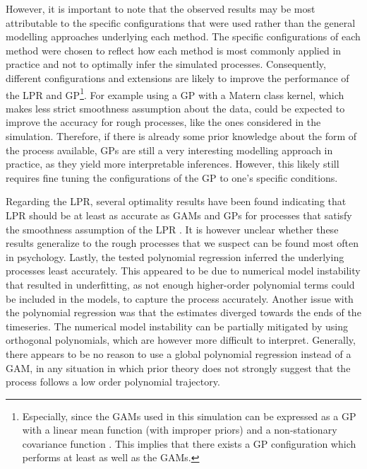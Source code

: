 \documentclass[man, floatsintext]{apa7}
\begin{document}
However, it is important to note that the observed results may be most
attributable to the specific configurations that were used rather than the
general modelling approaches underlying each method. The specific
configurations of each method were chosen to reflect how each method is most
commonly applied in practice and not to optimally infer the simulated
processes. Consequently, different configurations and extensions are likely to
improve the performance of the LPR and GP\footnote{Especially, since the GAMs
  used in this simulation can be expressed as a GP with a linear mean function
  (with improper priors) and a non-stationary covariance function
  \parencite{wahba_improper_1978, rasmussen_gaussian_2006}. This implies that
  there exists a GP configuration which performs at least as well as the
  GAMs.}.
For example using a GP with a Matern class kernel, which makes less strict
smoothness assumption about the data, could be expected to improve the accuracy
for rough processes, like the ones considered in the simulation. Therefore, if
there is already some prior knowledge about the form of the process available,
GPs are still a very interesting modelling approach in practice, as they yield
more interpretable inferences. However, this likely still requires fine tuning
the configurations of the GP to one's specific conditions.

Regarding the LPR, several optimality results have been found indicating that
LPR should be at least as accurate as GAMs and GPs for processes that satisfy
the smoothness assumption of the LPR \parencite{fan_local_1997}. It is however
unclear whether these results generalize to the rough processes that we suspect
can be found most often in psychology. Lastly, the tested polynomial regression
inferred the underlying processes least accurately. This appeared to be due to
numerical model instability that resulted in underfitting, as not enough
higher-order polynomial terms could be included in the models, to capture the
process accurately. Another issue with the polynomial regression was that the
estimates diverged towards the ends of the timeseries. The numerical model
instability can be partially mitigated by using orthogonal polynomials, which
are however more difficult to interpret. Generally, there appears to be no
reason to use a global polynomial regression instead of a GAM, in any situation
in which prior theory does not strongly suggest that the process follows a low
order polynomial trajectory.
\end{document}
